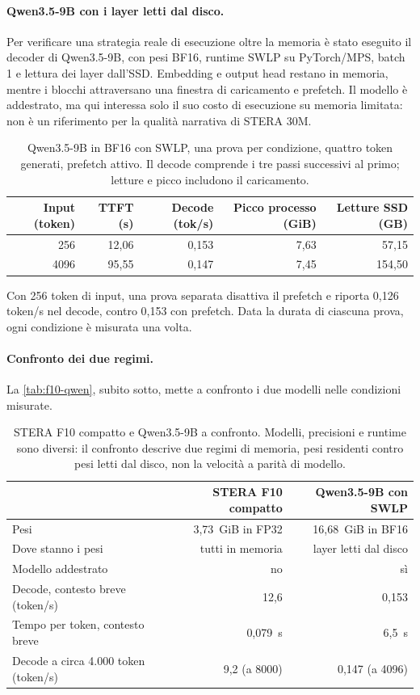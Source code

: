 \paragraph{Qwen3.5-9B con i layer letti dal disco.} Per verificare una strategia reale di esecuzione oltre la memoria è stato eseguito il decoder di Qwen3.5-9B, con pesi BF16, runtime SWLP su PyTorch/MPS, batch 1 e lettura dei layer dall'SSD. Embedding e output head restano in memoria, mentre i blocchi attraversano una finestra di caricamento e prefetch. Il modello è addestrato, ma qui interessa solo il suo costo di esecuzione su memoria limitata: non è un riferimento per la qualità narrativa di STERA 30M.

\begin{table}[H]
\centering
\small
\begin{tabular}{rrrrr}
\toprule
Input (token) & TTFT (s) & Decode (tok/s) & Picco processo (GiB) & Letture SSD (GB) \\
\midrule
256 & 12,06 & 0,153 & 7,63 & 57,15 \\
\num{4096} & 95,55 & 0,147 & 7,45 & 154,50 \\
\bottomrule
\end{tabular}
\caption{Qwen3.5-9B in BF16 con SWLP, una prova per condizione, quattro token generati, prefetch attivo. Il decode comprende i tre passi successivi al primo; letture e picco includono il caricamento.}
\label{tab:qwen-swlp}
\end{table}

Con 256 token di input, una prova separata disattiva il prefetch e riporta 0,126 token/s nel decode, contro 0,153 con prefetch. Data la durata di ciascuna prova, ogni condizione è misurata una volta.

\paragraph{Confronto dei due regimi.} La \autoref{tab:f10-qwen}, subito sotto, mette a confronto i due modelli nelle condizioni misurate.

\begin{table}[H]
\centering
\small
\begin{tabular}{lrr}
\toprule
& STERA F10 compatto & Qwen3.5-9B con SWLP \\
\midrule
Pesi & 3,73~GiB in FP32 & 16,68~GiB in BF16 \\
Dove stanno i pesi & tutti in memoria & layer letti dal disco \\
Modello addestrato & no & sì \\
Decode, contesto breve (token/s) & 12,6 & 0,153 \\
Tempo per token, contesto breve & 0,079~s & 6,5~s \\
Decode a circa 4.000 token (token/s) & 9,2 (a \num{8000}) & 0,147 (a \num{4096}) \\
\bottomrule
\end{tabular}
\caption{STERA F10 compatto e Qwen3.5-9B a confronto. Modelli, precisioni e runtime sono diversi: il confronto descrive due regimi di memoria, pesi residenti contro pesi letti dal disco, non la velocità a parità di modello.}
\label{tab:f10-qwen}
\end{table}

